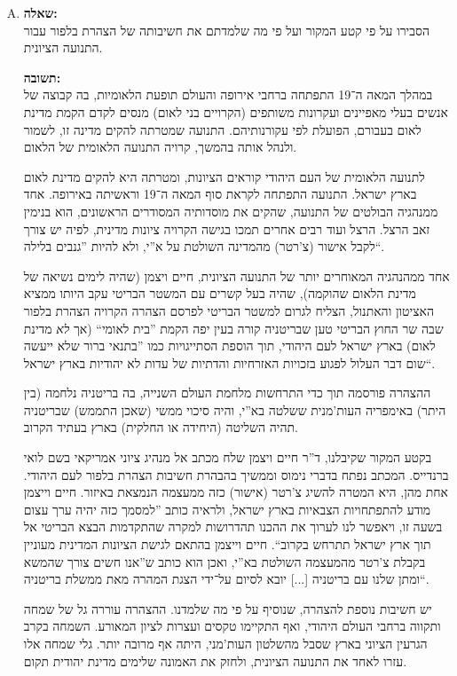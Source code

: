 \documentclass[a4paper]{article}
\newcommand\hl[1]   {#1}
\begin{document}
		\begin{enumerate}[A.]
			\item \textbf{שאלה: }\\
			הסבירו על פי קטע המקור ועל פי מה שלמדתם את חשיבותה של הצהרת בלפור עבור התנועה הציונית. 
			
			\textbf{תשובה: }\\
			במהלך המאה ה־19 התפתחה ברחבי אירופה והעולם תופעת ה\hl{לאומיות}, בה קבוצה של אנשים בעלי מאפיינים ועקרונות משותפים (הקרויים \hl{בני לאום}) מנסים לקדם הקמת \hl{מדינת לאום} בעבורם, הפועלת לפי עקורנותיהם. התנועה שמטרתה להקים מדינה זו, לשמור ולנהל אותה בהמשך, קרויה \hl{התנועה הלאומית} של הלאום. 
			
			לתנועה הלאומית של העם היהודי קוראים \hl{הציונות}, ומטרתה היא להקים מדינת לאום בארץ ישראל. התנועה התפתחה לקראת סוף המאה ה־19 וראשיתה באירופה. אחד ממנהגיה הבולטים של התנועה, שהקים את מוסדותיה המסודרים הראשונים, הוא \hl{בנימין זאב הרצל}. הרצל ועוד רבים אחרים תמכו בגישה הקרויה \hl{ציונות מדינית}, לפיה יש צורך לקבל אישור (צ'רטר) מהמדינה השולטת על א''י, ולא להיות ''גנבים בלילה``.
			
			אחד ממהנהגיה המאוחרים יותר של התנועה הציונית, חיים ויצמן (שהיה לימים נשיאה של מדינת הלאום שהוקמה), שהיה בעל קשרים עם \hl{המשטר הבריטי} עקב היותו ממציא האציטון והאתנול, הצליח לגרום למשטר הבריטי לפרסם הצהרה הקרויה \hl{הצהרת בלפור} שבה שר החוץ הבריטי טען שבריטניה קורה בעין יפה הקמת ''בית לאומי`` (אך \textit{לא} מדינת לאום) בארץ ישראל לעם היהודי, תוך הוספת הסתייגויות כמו ''בתנאי ברור שלא ייעשה שום דבר העלול לפגוע בזכויות האזרחיות והדתיות של עדות לא יהודיות בארץ ישראל``. 
			
			ההצהרה פורסמה תוך כדי התרחשות \hl{מלחמת העולם השנייה}, בה בריטניה נלחמה (בין היתר) באימפריה  העות'מנית ששלטה בא''י, והיה סיכוי ממשי (שאכן התממש) שבריטניה תהיה השליטה (היחידה או החלקית) בארץ בעתיד הקרוב. 
			
			בקטע המקור שקיבלנו, ד''ר חיים ויצמן שלח מכתב אל מנהיג ציוני אמריקאי בשם לואי ברנדייס. המכתב נפתח בדברי נימוס וממשיך בהבהרת חשיבות הצהרת בלפור לעם היהודי. אחת מהן, היא המטרה להשיג צ'רטר (אישור) כזה ממעצמה הנמצאת באיזור. חיים וייצמן מודע להתפתחויות הצבאיות בארץ ישראל, ולראיה כותב ''למסמך כזה יהיה ערך עצום בשעה זו, ויאפשר לנו לערוך את ההכנו תהדרושות למקרה שהתקדמות הבצא הבריטי אל תוך ארץ ישראל תתרחש בקרוב``. חיים וייצמן בהתאם לגישת הציונות המדינית מעוניין בקבלת צ'רטר מהמעצמה השולטת בא''י, ואכן הוא כותב ש''אנו חשים צורך שהמשא ומתן שלנו עם בריטניה [...] יובא לסיום על־ידי הצגת המהרה מאת ממשלת בריטניה``. 
			
			יש חשיבות נוספת להצהרה, שנוסיף על פי מה שלמדנו. ההצהרה עוררה גל של שמחה ותקווה ברחבי העולם היהודי, ואף התקיימו טקסים ועצרות לציון המאורע. השמחה בקרב הגרעין הציוני בארץ שסבל מהשלטון העות'מני, היתה אף מרובה יותר. גלי שמחה אלו עזרו לאחד את התנועה הציונית, ולחזק את האמונה שלימים מדינת יהודית תקום. 
			

\end{enumerate}
\end{document}
